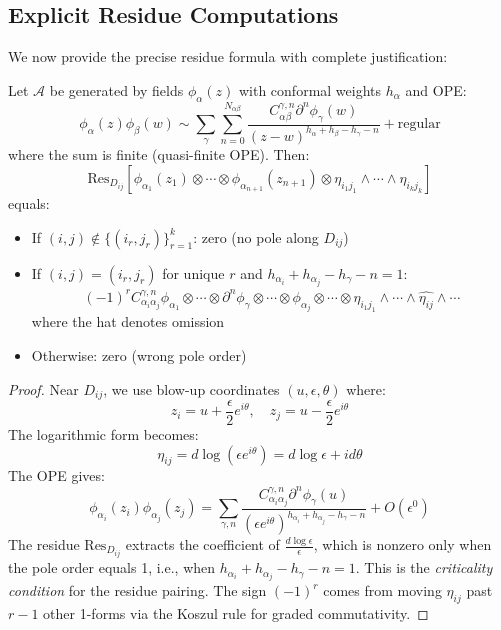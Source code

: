 \subsection{Explicit Residue Computations}
 
We now provide the precise residue formula with complete justification:
 
\begin{theorem}\label{thm:residue-formula}
Let $\mathcal{A}$ be generated by fields $\phi_\alpha(z)$ with conformal weights $h_\alpha$ and OPE:
\[
\phi_\alpha(z)\phi_\beta(w) \sim \sum_{\gamma} \sum_{n=0}^{N_{\alpha\beta}} 
\frac{C^{\gamma,n}_{\alpha\beta} \partial^n\phi_\gamma(w)}{(z-w)^{h_\alpha + h_\beta - h_\gamma - n}}
+ \text{regular}
\]
where the sum is finite (quasi-finite OPE). Then:
\[
\text{Res}_{D_{ij}}[\phi_{\alpha_1}(z_1) \otimes \cdots \otimes \phi_{\alpha_{n+1}}(z_{n+1}) 
\otimes \eta_{i_1j_1} \wedge \cdots \wedge \eta_{i_kj_k}]
\]
equals:
\begin{itemize}
\item If $(i,j) \notin \{(i_r, j_r)\}_{r=1}^k$: zero (no pole along $D_{ij}$)
\item If $(i,j) = (i_r, j_r)$ for unique $r$ and $h_{\alpha_i} + h_{\alpha_j} - h_\gamma - n = 1$:
\[
(-1)^r C^{\gamma,n}_{\alpha_i\alpha_j} \phi_{\alpha_1} \otimes \cdots \otimes \partial^n\phi_\gamma \otimes \cdots 
\otimes \widehat{\phi_{\alpha_j}} \otimes \cdots \otimes \eta_{i_1j_1} \wedge \cdots \wedge \widehat{\eta_{ij}} \wedge \cdots
\]
where the hat denotes omission
\item Otherwise: zero (wrong pole order)
\end{itemize}
\end{theorem}
 
\begin{proof}
Near $D_{ij}$, we use blow-up coordinates $(u, \epsilon, \theta)$ where:
\[
z_i = u + \frac{\epsilon}{2}e^{i\theta}, \quad z_j = u - \frac{\epsilon}{2}e^{i\theta}
\]
The logarithmic form becomes:
\[
\eta_{ij} = d\log(\epsilon e^{i\theta}) = d\log\epsilon + id\theta
\]
The OPE gives:
\[
\phi_{\alpha_i}(z_i)\phi_{\alpha_j}(z_j) = \sum_{\gamma,n} 
\frac{C^{\gamma,n}_{\alpha_i\alpha_j} \partial^n\phi_\gamma(u)}{(\epsilon e^{i\theta})^{h_{\alpha_i} + h_{\alpha_j} - h_\gamma - n}}
+ O(\epsilon^0)
\]
The residue $\text{Res}_{D_{ij}}$ extracts the coefficient of $\frac{d\log\epsilon}{\epsilon}$, which is 
nonzero only when the pole order equals 1, i.e., when $h_{\alpha_i} + h_{\alpha_j} - h_\gamma - n = 1$. This is the 
\emph{criticality condition} for the residue pairing. The sign $(-1)^r$ comes from 
moving $\eta_{ij}$ past $r-1$ other 1-forms via the Koszul rule for graded
commutativity.
\end{proof}
 
